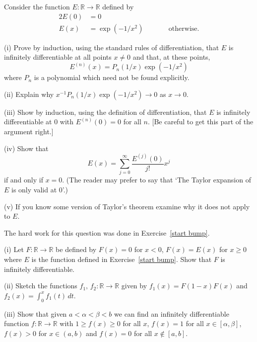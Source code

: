 \begin{question}\label{start bump} Consider the function
$E:{\mathbb R}\rightarrow{\mathbb R}$ defined by
\begin{alignat*}{2}
E(0)&=0\\
E(x)&=\exp(-1/x^{2})&&\qquad\text{otherwise}.
\end{alignat*}

(i) Prove by induction, using the standard rules of differentiation,
that $E$ is infinitely differentiable at all points $x\neq 0$
and that, at these points,
\[E^{(n)}(x)=P_{n}(1/x)\exp(-1/x^{2})\]
where $P_{n}$ is a polynomial which need not be found explicitly.

(ii) Explain why $x^{-1}P_{n}(1/x)\exp(-1/x^{2})\rightarrow 0$
as $x\rightarrow 0$.

(iii) Show by induction, using the definition of differentiation,
that $E$ is infinitely differentiable at $0$
with $E^{(n)}(0)=0$ for all $n$.
[Be careful to get this part of the argument
right.]

(iv) Show that
\[E(x)=\sum_{j=0}^{\infty}\frac{E^{(j)}(0)}{j!}x^{j}\]
if and only if $x=0$. (The reader may prefer to say
that `The Taylor expansion of $E$ is only valid at $0$'.)

(v) If you know some version of Taylor's theorem examine
why it does not apply to $E$.
\end{question}
\begin{question}\label{end bump}
The hard work for this question was done in
Exercise~\ref{start bump}.

(i) Let $F:{\mathbb R}\rightarrow{\mathbb R}$ be defined by
$F(x)=0$ for $x<0$, $F(x)=E(x)$ for $x\geq 0$ where
$E$ is the function defined in Exercise~\ref{start bump}.
Show that $F$ is infinitely differentiable.

(ii) Sketch the functions $f_{1},\,f_{2}:{\mathbb R}\rightarrow{\mathbb R}$
given by $f_{1}(x)=F(1-x)F(x)$ and $f_{2}(x)=\int_{0}^{x}f_{1}(t)\,dt$.

(iii) Show that given $a<\alpha<\beta<b$ we can find an
infinitely differentiable function $f:{\mathbb R}\rightarrow{\mathbb R}$
with $1\geq f(x)\geq 0$ for all $x$, $f(x)=1$ for all $x\in[\alpha,\beta]$,
$f(x)>0$ for $x\in(a,b)$
and $f(x)=0$ for all $x\notin [a,b]$.
\end{question}
